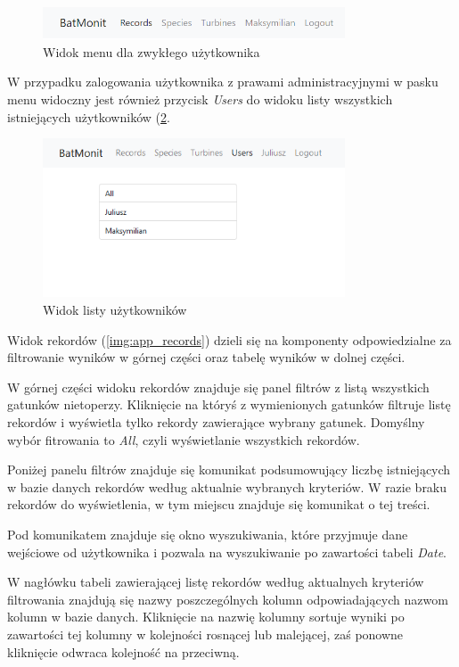 \documentclass{sprz}
\begin{document}
\begin{figure}[h]
  \centering
  \includegraphics[width=0.8\textwidth]{sprz/app_menu_regular_user}
  \caption{Widok menu dla zwykłego użytkownika}
  \label{img:app_menu_regular_user}
\end{figure}

W przypadku zalogowania użytkownika z prawami administracyjnymi w pasku menu widoczny jest również przycisk \textit{Users} do widoku listy wszystkich istniejących użytkowników (\ref{img:app_users}.

\begin{figure}[h]
  \centering
  \includegraphics[width=0.8\textwidth]{sprz/app_users}
  \caption{Widok listy użytkowników}
  \label{img:app_users}
\end{figure}

Widok rekordów (\ref{img:app_records}) dzieli się na komponenty odpowiedzialne za filtrowanie wyników w górnej części oraz tabelę wyników w dolnej części.

W górnej części widoku rekordów znajduje się panel filtrów z listą wszystkich gatunków nietoperzy. Kliknięcie na któryś z wymienionych gatunków filtruje listę rekordów i wyświetla tylko rekordy zawierające wybrany gatunek. Domyślny wybór fitrowania to \textit{All}, czyli wyświetlanie wszystkich rekordów.

Poniżej panelu filtrów znajduje się komunikat podsumowujący liczbę istniejących w bazie danych rekordów według aktualnie wybranych kryteriów. W razie braku rekordów do wyświetlenia, w tym miejscu znajduje się komunikat o tej treści.

Pod komunikatem znajduje się okno wyszukiwania, które przyjmuje dane wejściowe od użytkownika i pozwala na wyszukiwanie po zawartości tabeli \textit{Date}.

W nagłówku tabeli zawierającej listę rekordów według aktualnych kryteriów filtrowania znajdują się nazwy poszczególnych kolumn odpowiadających nazwom kolumn w bazie danych. Kliknięcie na nazwię kolumny sortuje wyniki po zawartości tej kolumny w kolejności rosnącej lub malejącej, zaś ponowne kliknięcie odwraca kolejność na przeciwną.
\end{document}
